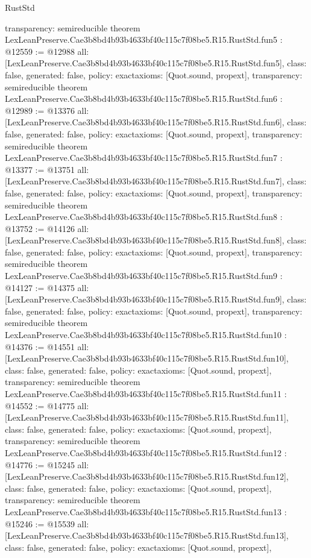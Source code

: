 \begin{lexlean}{RustStd}
\begin{coremodule}
{  transparency: semireducible
}
theorem LexLeanPreserve.Cae3b8bd4b93b4633bf40c115c7f08be5.R15.RustStd.fun5 : @12559 := @12988 {
  all: [LexLeanPreserve.Cae3b8bd4b93b4633bf40c115c7f08be5.R15.RustStd.fun5],
  class: false,
  generated: false,
  policy: exact{axioms: [Quot.sound, propext]},
  transparency: semireducible
}
theorem LexLeanPreserve.Cae3b8bd4b93b4633bf40c115c7f08be5.R15.RustStd.fun6 : @12989 := @13376 {
  all: [LexLeanPreserve.Cae3b8bd4b93b4633bf40c115c7f08be5.R15.RustStd.fun6],
  class: false,
  generated: false,
  policy: exact{axioms: [Quot.sound, propext]},
  transparency: semireducible
}
theorem LexLeanPreserve.Cae3b8bd4b93b4633bf40c115c7f08be5.R15.RustStd.fun7 : @13377 := @13751 {
  all: [LexLeanPreserve.Cae3b8bd4b93b4633bf40c115c7f08be5.R15.RustStd.fun7],
  class: false,
  generated: false,
  policy: exact{axioms: [Quot.sound, propext]},
  transparency: semireducible
}
theorem LexLeanPreserve.Cae3b8bd4b93b4633bf40c115c7f08be5.R15.RustStd.fun8 : @13752 := @14126 {
  all: [LexLeanPreserve.Cae3b8bd4b93b4633bf40c115c7f08be5.R15.RustStd.fun8],
  class: false,
  generated: false,
  policy: exact{axioms: [Quot.sound, propext]},
  transparency: semireducible
}
theorem LexLeanPreserve.Cae3b8bd4b93b4633bf40c115c7f08be5.R15.RustStd.fun9 : @14127 := @14375 {
  all: [LexLeanPreserve.Cae3b8bd4b93b4633bf40c115c7f08be5.R15.RustStd.fun9],
  class: false,
  generated: false,
  policy: exact{axioms: [Quot.sound, propext]},
  transparency: semireducible
}
theorem LexLeanPreserve.Cae3b8bd4b93b4633bf40c115c7f08be5.R15.RustStd.fun10 : @14376 := @14551 {
  all: [LexLeanPreserve.Cae3b8bd4b93b4633bf40c115c7f08be5.R15.RustStd.fun10],
  class: false,
  generated: false,
  policy: exact{axioms: [Quot.sound, propext]},
  transparency: semireducible
}
theorem LexLeanPreserve.Cae3b8bd4b93b4633bf40c115c7f08be5.R15.RustStd.fun11 : @14552 := @14775 {
  all: [LexLeanPreserve.Cae3b8bd4b93b4633bf40c115c7f08be5.R15.RustStd.fun11],
  class: false,
  generated: false,
  policy: exact{axioms: [Quot.sound, propext]},
  transparency: semireducible
}
theorem LexLeanPreserve.Cae3b8bd4b93b4633bf40c115c7f08be5.R15.RustStd.fun12 : @14776 := @15245 {
  all: [LexLeanPreserve.Cae3b8bd4b93b4633bf40c115c7f08be5.R15.RustStd.fun12],
  class: false,
  generated: false,
  policy: exact{axioms: [Quot.sound, propext]},
  transparency: semireducible
}
theorem LexLeanPreserve.Cae3b8bd4b93b4633bf40c115c7f08be5.R15.RustStd.fun13 : @15246 := @15539 {
  all: [LexLeanPreserve.Cae3b8bd4b93b4633bf40c115c7f08be5.R15.RustStd.fun13],
  class: false,
  generated: false,
  policy: exact{axioms: [Quot.sound, propext]},
}
\end{coremodule}
\end{lexlean}
